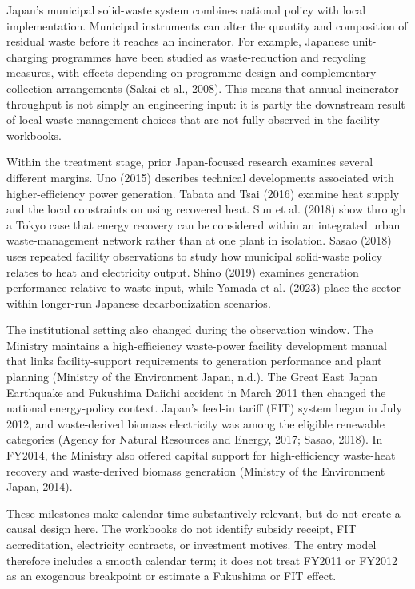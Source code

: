 \documentclass[12pt,a4paper]{article}
\begin{document}
Japan's municipal solid-waste system combines national policy with local
implementation. Municipal instruments can alter the quantity and composition of
residual waste before it reaches an incinerator. For example, Japanese
unit-charging programmes have been studied as waste-reduction and recycling
measures, with effects depending on programme design and complementary
collection arrangements (Sakai et al., 2008). This means that annual incinerator
throughput is not simply an engineering input: it is partly the downstream result
of local waste-management choices that are not fully observed in the facility
workbooks.

Within the treatment stage, prior Japan-focused research examines several
different margins. Uno (2015) describes technical developments associated with
higher-efficiency power generation. Tabata and Tsai (2016) examine heat supply
and the local constraints on using recovered heat. Sun et al. (2018) show through
a Tokyo case that energy recovery can be considered within an integrated urban
waste-management network rather than at one plant in isolation. Sasao (2018)
uses repeated facility observations to study how municipal solid-waste policy
relates to heat and electricity output. Shino (2019) examines generation
performance relative to waste input, while Yamada et al. (2023) place the sector
within longer-run Japanese decarbonization scenarios.

The institutional setting also changed during the observation window. The
Ministry maintains a high-efficiency waste-power facility development manual
that links facility-support requirements to generation performance and plant
planning (Ministry of the Environment Japan, n.d.). The Great East Japan
Earthquake and Fukushima Daiichi accident in March 2011 then changed the
national energy-policy context. Japan's feed-in tariff (FIT) system began in
July 2012, and waste-derived biomass electricity was among the eligible
renewable categories (Agency for Natural Resources and Energy, 2017; Sasao,
2018). In FY2014, the Ministry also offered capital support for high-efficiency
waste-heat recovery and waste-derived biomass generation (Ministry of the
Environment Japan, 2014).

These milestones make calendar time substantively relevant, but do not create a
causal design here. The workbooks do not identify subsidy receipt, FIT
accreditation, electricity contracts, or investment motives. The entry model
therefore includes a smooth calendar term; it does not treat FY2011 or FY2012 as
an exogenous breakpoint or estimate a Fukushima or FIT effect.
\end{document}
